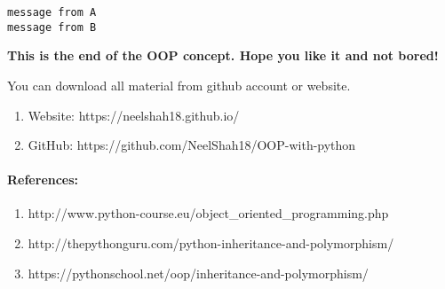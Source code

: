 \documentclass[11pt]{article}
\begin{document}
    \begin{Verbatim}[commandchars=\\\{\}]
message from A
message from B

    \end{Verbatim}

    \textbf{This is the end of the OOP concept. Hope you like it and not
bored!}

You can download all material from github account or website.

\begin{enumerate}
\def\labelenumi{\arabic{enumi})}
\item
  Website: https://neelshah18.github.io/
\item
  GitHub: https://github.com/NeelShah18/OOP-with-python
\end{enumerate}

    \paragraph{References:}\label{references}

\begin{enumerate}
\def\labelenumi{\arabic{enumi})}
\item
  http://www.python-course.eu/object\_oriented\_programming.php
\item
  http://thepythonguru.com/python-inheritance-and-polymorphism/
\item
  https://pythonschool.net/oop/inheritance-and-polymorphism/
\end{enumerate}


    
    
    
    
\end{document}
